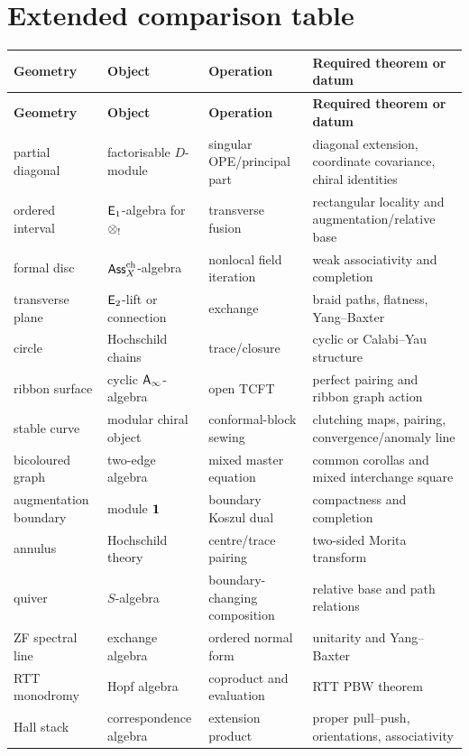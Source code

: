 \chapter{Extended comparison table}\label{app:comparison}

\begin{longtable}{p{}p{}p{}p{}}
\toprule
\textbf{Geometry} & \textbf{Object} & \textbf{Operation} & \textbf{Required theorem or datum}\\
\midrule
\endfirsthead
\toprule
\textbf{Geometry} & \textbf{Object} & \textbf{Operation} & \textbf{Required theorem or datum}\\
\midrule
\endhead
partial diagonal & factorisable \(D\)-module & singular OPE/principal part & diagonal extension, coordinate covariance, chiral identities\\
ordered interval & \(\mathsf E_1\)-algebra for \(\mathbin{\otimes_{!}}\) & transverse fusion & rectangular locality and augmentation/relative base\\
formal disc & \(\mathsf{Ass}^{\mathrm{ch}}_X\)-algebra & nonlocal field iteration & weak associativity and completion\\
transverse plane & \(\mathsf E_2\)-lift or connection & exchange & braid paths, flatness, Yang--Baxter\\
circle & Hochschild chains & trace/closure & cyclic or Calabi--Yau structure\\
ribbon surface & cyclic \(\mathsf A_\infty\)-algebra & open TCFT & perfect pairing and ribbon graph action\\
stable curve & modular chiral object & conformal-block sewing & clutching maps, pairing, convergence/anomaly line\\
bicoloured graph & two-edge algebra & mixed master equation & common corollas and mixed interchange square\\
augmentation boundary & module \(\mathbf 1\) & boundary Koszul dual & compactness and completion\\
annulus & Hochschild theory & centre/trace pairing & two-sided Morita transform\\
quiver & \(S\)-algebra & boundary-changing composition & relative base and path relations\\
ZF spectral line & exchange algebra & ordered normal form & unitarity and Yang--Baxter\\
RTT monodromy & Hopf algebra & coproduct and evaluation & RTT PBW theorem\\
Hall stack & correspondence algebra & extension product & proper pull--push, orientations, associativity\\

\end{longtable}
